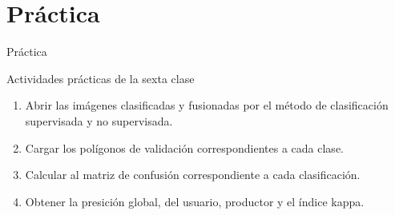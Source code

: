\documentclass[]{beamer}
\begin{document}
\section{Práctica}

\begin{frame}{Práctica}
  \begin{exampleblock}{Actividades prácticas de la sexta clase}
    \begin{enumerate}
      \item Abrir las imágenes clasificadas y fusionadas por el método de clasificación supervisada y no supervisada.
      \item Cargar los polígonos de validación correspondientes a cada clase.
      \item Calcular al matriz de confusión correspondiente a cada clasificación.
      \item Obtener la presición global, del usuario, productor y el índice kappa.
    \end{enumerate}
  \end{exampleblock}
\end{frame}
\end{document}
